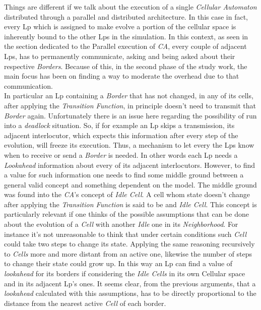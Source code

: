 \documentclass[12pt,a4paper,fleqn]{report}
\begin{document}
Things are different if we talk about the execution of a single \textit{Cellular Automaton} distributed through a parallel and distributed architecture. In this case in fact, every Lp which is assigned to make evolve a portion of the cellular space is inherently bound to the other Lps in the simulation. In this context, as seen in the section dedicated to the Parallel execution of \textit{CA}, every couple of adjacent Lps, has to permanently communicate, asking and being asked about their respective \textit{Borders}. Because of this, in the second phase of the study work, the main focus has been on finding a way to moderate the overhead due to that communication.\\ 
In particular an Lp containing a \textit{Border} that has not changed, in any of its cells, after applying the \textit{Transition Function}, in principle doesn't need to transmit that \textit{Border} again. Unfortunately there is an issue here regarding the possibility of run into a \textit{deadlock} situation. So, if for example an Lp skips a transmission, its adjacent interlocutor, which expects this information after every step of the evolution, will freeze its execution. Thus, a mechanism to let every the Lps know when to receive or send a \textit{Border} is needed. In other words each Lp needs a \textit{Lookahead} information about every of its adjacent interlocutors. However, to find a value for such information one needs to find some middle ground between a general valid concept and something dependent on the model. The middle ground was found into the \textit{CA}'s concept of \textit{Idle Cell}. A cell whom state doesn't change after applying the \textit{Transition Function} is said to be and \textit{Idle Cell}. This concept is particularly relevant if one thinks of the possible assumptions that can be done about the evolution of a \textit{Cell} with another \textit{Idle} one in its \textit{Neighborhood}. For instance it's not unreasonable to think that under certain conditions such \textit{Cell} could take two steps to change its state. Applying the same reasoning recursively to \textit{Cells} more and more distant from an active one, likewise the number of steps to change their state could grow up. In this way an Lp can find a value of \textit{lookahead} for its borders if considering the \textit{Idle Cells} in its own Cellular space and in its adjacent Lp's ones. It seems clear, from the previous arguments, that a \textit{lookahead} calculated with this assumptions, has to be directly proportional to the distance from the nearest active \textit{Cell} of each border.
\end{document}
